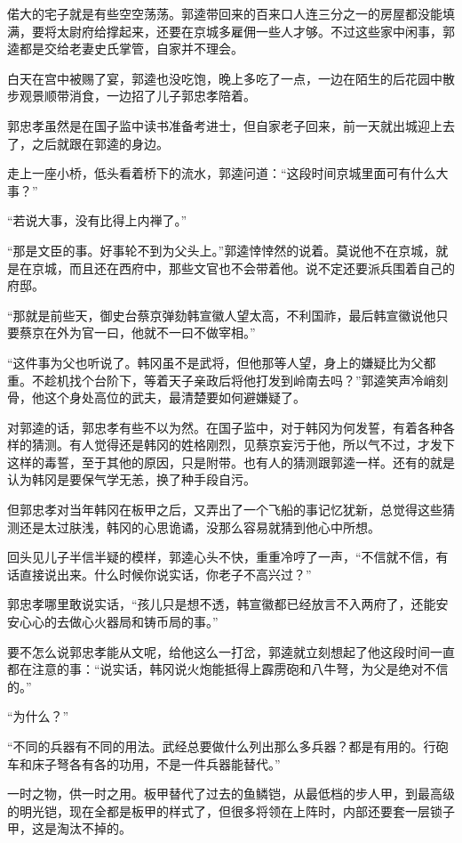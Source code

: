 偌大的宅子就是有些空空荡荡。郭逵带回来的百来口人连三分之一的房屋都没能填满，要将太尉府给撑起来，还要在京城多雇佣一些人才够。不过这些家中闲事，郭逵都是交给老妻史氏掌管，自家并不理会。

白天在宫中被赐了宴，郭逵也没吃饱，晚上多吃了一点，一边在陌生的后花园中散步观景顺带消食，一边招了儿子郭忠孝陪着。

郭忠孝虽然是在国子监中读书准备考进士，但自家老子回来，前一天就出城迎上去了，之后就跟在郭逵的身边。

走上一座小桥，低头看着桥下的流水，郭逵问道：“这段时间京城里面可有什么大事？”

“若说大事，没有比得上内禅了。”

“那是文臣的事。好事轮不到为父头上。”郭逵悻悻然的说着。莫说他不在京城，就是在京城，而且还在西府中，那些文官也不会带着他。说不定还要派兵围着自己的府邸。

“那就是前些天，御史台蔡京弹劾韩宣徽人望太高，不利国祚，最后韩宣徽说他只要蔡京在外为官一曰，他就不一曰不做宰相。”

“这件事为父也听说了。韩冈虽不是武将，但他那等人望，身上的嫌疑比为父都重。不趁机找个台阶下，等着天子亲政后将他打发到岭南去吗？”郭逵笑声冷峭刻骨，他这个身处高位的武夫，最清楚要如何避嫌疑了。

对郭逵的话，郭忠孝有些不以为然。在国子监中，对于韩冈为何发誓，有着各种各样的猜测。有人觉得还是韩冈的姓格刚烈，见蔡京妄污于他，所以气不过，才发下这样的毒誓，至于其他的原因，只是附带。也有人的猜测跟郭逵一样。还有的就是认为韩冈是要保气学无恙，换了种手段自污。

但郭忠孝对当年韩冈在板甲之后，又弄出了一个飞船的事记忆犹新，总觉得这些猜测还是太过肤浅，韩冈的心思诡谲，没那么容易就猜到他心中所想。

回头见儿子半信半疑的模样，郭逵心头不快，重重冷哼了一声，“不信就不信，有话直接说出来。什么时候你说实话，你老子不高兴过？”

郭忠孝哪里敢说实话，“孩儿只是想不透，韩宣徽都已经放言不入两府了，还能安安心心的去做心火器局和铸币局的事。”

要不怎么说郭忠孝能从文呢，给他这么一打岔，郭逵就立刻想起了他这段时间一直都在注意的事：“说实话，韩冈说火炮能抵得上霹雳砲和八牛弩，为父是绝对不信的。”

“为什么？”

“不同的兵器有不同的用法。武经总要做什么列出那么多兵器？都是有用的。行砲车和床子弩各有各的功用，不是一件兵器能替代。”

一时之物，供一时之用。板甲替代了过去的鱼鳞铠，从最低档的步人甲，到最高级的明光铠，现在全都是板甲的样式了，但很多将领在上阵时，内部还要套一层锁子甲，这是淘汰不掉的。

